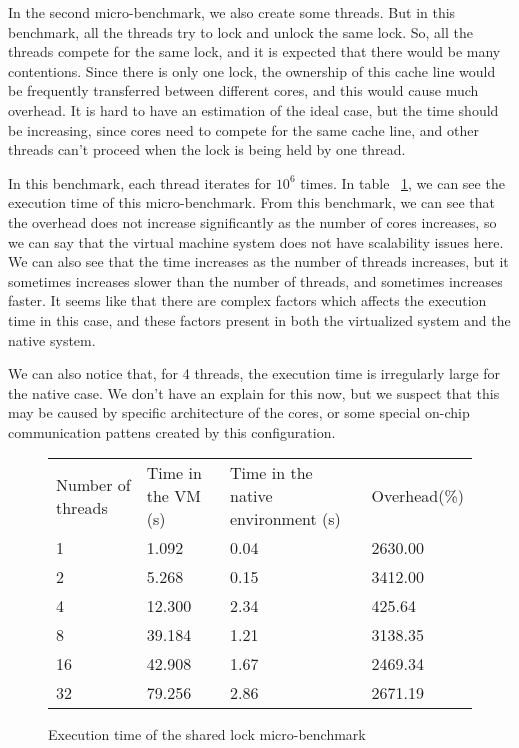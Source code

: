 In the second micro-benchmark, we also create some threads. But in this
benchmark, all the threads try to lock and unlock the same lock. So, all the
threads compete for the same lock, and it is expected that there would be many
contentions.  Since there is only one lock, the ownership of this cache line
would be frequently transferred between different cores, and this would cause
much overhead. It is hard to have an estimation of the ideal case, but the time
should be increasing, since cores need to compete for the same cache line, and
other threads can't proceed when the lock is being held by one thread.

In this benchmark, each thread iterates for $10^6$ times.
In table ~\ref{fig:com_mutex}, we can see the execution time of this micro-benchmark.
From this benchmark, we can see that the overhead does not increase significantly
as the number of cores increases, so we can say that the virtual machine system
does not have scalability issues here.
We can also see that the time increases as the number of threads increases, but
it sometimes increases slower than the number of threads, and sometimes increases
faster. It seems like that there are complex factors which affects the execution
time in this case, and these factors present in both the virtualized system and the
native system.

We can also notice that, for 4 threads, the execution time is irregularly large
for the native case. We don't have an explain for this now, but we suspect that
this may be caused by specific architecture of the cores, or some special
on-chip communication pattens created by this configuration.

\begin{figure}[here]
\begin{tabular}{  l | l | l | l }
	Number of threads & Time in the VM (s) & Time in the native environment (s) & Overhead(\%) \\
	1 & 1.092 & 0.04 & 2630.00 \\
	2 & 5.268 & 0.15 & 3412.00 \\
	4 & 12.300 & 2.34 & 425.64 \\
	8 & 39.184 & 1.21 & 3138.35 \\
	16 & 42.908 & 1.67 & 2469.34 \\
	32 & 79.256 & 2.86 & 2671.19 \\
\end{tabular}
\caption{Execution time of the shared lock micro-benchmark}
\label{fig:com_mutex}
\end{figure}


